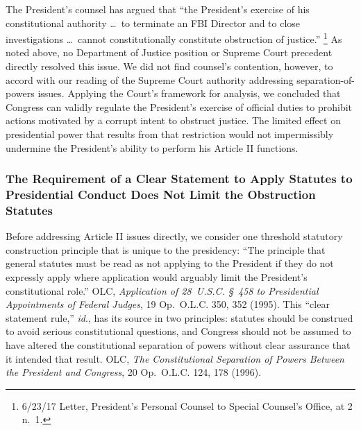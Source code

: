 The President's counsel has argued that ``the President's exercise of his constitutional authority \dots\ to terminate an FBI Director and to close investigations \dots\ cannot constitutionally constitute obstruction of justice.''%
\footnote{6/23/17 Letter, President's Personal Counsel to Special Counsel's Office, at 2 n.~1.}
As noted above, no Department of Justice position or Supreme Court precedent directly resolved this issue.
We did not find counsel's contention, however, to accord with our reading of the Supreme Court authority addressing separation-of-powers issues.
Applying the Court's framework for analysis, we concluded that Congress can validly regulate the President's exercise of official duties to prohibit actions motivated by a corrupt intent to obstruct justice.
The limited effect on presidential power that results from that restriction would not impermissibly undermine the President's ability to perform his Article II functions.

\subsubsection{The Requirement of a Clear Statement to Apply Statutes to Presidential Conduct Does Not Limit the Obstruction Statutes}

Before addressing Article II issues directly, we consider one threshold statutory construction principle that is unique to the presidency: ``The principle that general statutes must be read as not applying to the President if they do not expressly apply where application would arguably limit the President's constitutional role.''
OLC, \textit{Application of 28~U.S.C. \S~458 to Presidential Appointments of Federal Judges}, 19 Op.\ O.L.C. 350, 352 (1995).
This ``clear statement rule,'' \textit{id}., has its source in two principles: statutes should be construed to avoid serious constitutional questions, and Congress should not be assumed to have altered the constitutional separation of powers without clear assurance that it intended that result.
OLC, \textit{The Constitutional Separation of Powers Between the President and Congress}, 20 Op.\ O.L.C. 124, 178 (1996).

